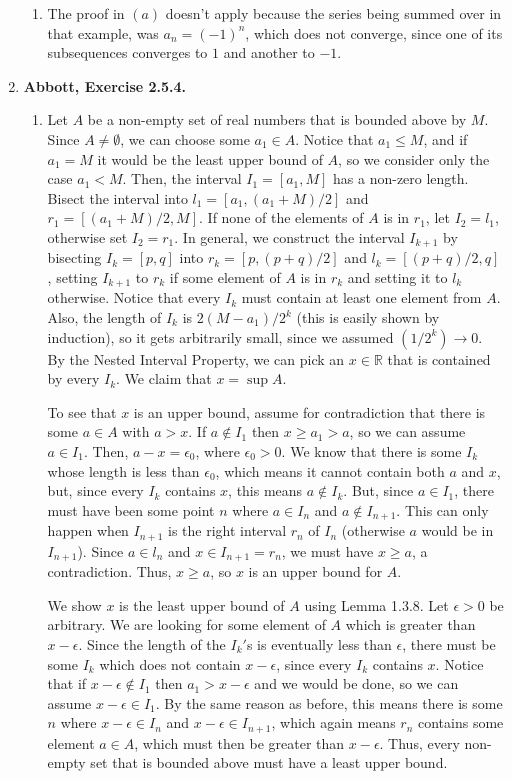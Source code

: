 \documentclass{article}
\newcommand{\R}{\mathbb{R}}
\newcommand{\ra}{\rightarrow}
\newcommand{\exc}[2][Abbott]{\item \textbf{#1, Exercise #2.}}
\newcommand{\lep}[1][L]{#1et $\epsilon > 0$ be arbitrary}
\begin{document}
\begin{enumerate}
\begin{enumerate}
        \item The proof in $(a)$ doesn't apply because the series being summed over in that example, was $a_n = (-1)^n$, which does not converge, since one of its subsequences converges to $1$ and another to $-1$.
    \end{enumerate}
    
    \exc{2.5.4}
    \begin{enumerate}
        \item Let $A$ be a non-empty set of real numbers that is bounded above by $M$. Since $A \neq \emptyset$, we can choose some $a_1 \in A$. Notice that $a_1 \leq M$, and if $a_1 = M$ it would be the least upper bound of $A$, so we consider only the case $a_1 < M$. Then, the interval $I_1 =[a_1, M]$ has a non-zero length. Bisect the interval into $l_1 = [a_1, (a_1+M)/2]$ and $r_1 = [(a_1+M)/2, M]$. If none of the elements of $A$ is in $r_1$, let $I_2 = l_1$, otherwise set $I_2 = r_1$. In general, we construct the interval $I_{k+1}$ by bisecting $I_k = [p, q]$ into $r_k=[p, (p+q)/2]$ and $l_k = [(p+q)/2, q]$, setting $I_{k+1}$ to $r_k$ if some element of $A$ is in $r_k$ and setting it to $l_k$ otherwise. Notice that every $I_k$ must contain at least one element from $A$. Also, the length of $I_k$ is $2 (M-a_1)/2^k$ (this is easily shown by induction), so it gets arbitrarily small, since we assumed $(1/2^k) \ra 0$. By the Nested Interval Property, we can pick an $x \in \R$ that is contained by every $I_k$. We claim that $x = \sup A$.
        
        To see that $x$ is an upper bound, assume for contradiction that there is some $a \in A$ with $a > x$. If $a \notin I_1$ then $x \geq a_1 > a$, so we can assume $a \in I_1$. Then, $a-x = \epsilon_0$, where $\epsilon_0 > 0$. We know that there is some $I_k$ whose length is less than $\epsilon_0$, which means it cannot contain both $a$ and $x$, but, since every $I_k$ contains $x$, this means $a \notin I_k$. But, since $a \in I_1$, there must have been some point $n$ where $a \in I_n$ and $a \notin I_{n+1}$. This can only happen when $I_{n+1}$ is the right interval $r_n$ of $I_n$ (otherwise $a$ would be in $I_{n+1}$). Since $a \in l_n$ and $x \in I_{n+1} = r_n$, we must have $x \geq a$, a contradiction. Thus, $x \geq a$, so $x$ is an upper bound for $A$.
        
        We show $x$ is the least upper bound of $A$ using Lemma 1.3.8. \lep. We are looking for some element of $A$ which is greater than $x-\epsilon$. Since the length of the $I_k'$s is eventually less than $\epsilon$, there must be some $I_k$ which does not contain $x-\epsilon$, since every $I_k$ contains $x$. Notice that if $x-\epsilon \notin I_1$ then $a_1 > x-\epsilon$ and we would be done, so we can assume $x-\epsilon \in I_1$. By the same reason as before, this means there is some $n$ where $x-\epsilon \in I_n$ and $x-\epsilon \in I_{n+1}$, which again means $r_n$ contains some element $a \in A$, which must then be greater than $x-\epsilon$. Thus, every non-empty set that is bounded above must have a least upper bound.
        

\end{enumerate}
\end{enumerate}
\end{document}

